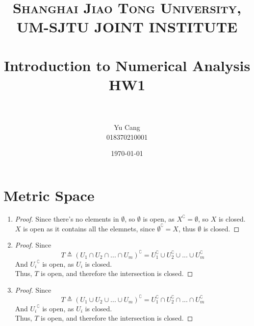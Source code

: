 \documentclass[paper=a4, fontsize=11pt]{scrartcl} %
\title{	
\normalfont \normalsize 
\textsc{Shanghai Jiao Tong University, UM-SJTU JOINT INSTITUTE} \\ [25pt] %
\horrule{0.5pt} \\[0.4cm] %
\huge Introduction to Numerical Analysis \\ HW1 \\ %
\horrule{2pt} \\[0.5cm] %
}
\author{Yu Cang \\ 018370210001} %
\date{\normalsize\today} %
\numberwithin{equation}{section} %
\numberwithin{figure}{section} %
\numberwithin{table}{section} %
\begin{document}
\maketitle %


\section{Metric Space}
\begin{enumerate}
	\item
		\begin{proof}
			Since there's no elements in $\emptyset$, so $\emptyset$ is open, as $X^\complement = \emptyset$, so $X$ is closed.\\
			$X$ is open as it contains all the elemnets, since $\emptyset^\complement = X$, thus $\emptyset$ is closed. 
		\end{proof}
	\item
		\begin{proof}
			Since
			\begin{equation}
				T \triangleq (U_1 \cap U_2 \cap ... \cap U_m)^\complement = U_1^\complement \cup U_2^\complement \cup ... \cup U_m^\complement
			\end{equation}
			And ${U_i}^\complement$ is open, as $U_i$ is closed.\\
			Thus, $T$ is open, and therefore the intersection is closed. 
		\end{proof}
	\item 
		\begin{proof}
			Since
			\begin{equation}
				T \triangleq (U_1 \cup U_2 \cup ... \cup U_m)^\complement = U_1^\complement \cap U_2^\complement \cap ... \cap U_m^\complement
			\end{equation}
			And ${U_i}^\complement$ is open, as $U_i$ is closed.\\
			Thus, $T$ is open, and therefore the intersection is closed. 
		\end{proof}

\end{enumerate}


\end{document}
